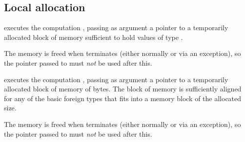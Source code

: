 \subsection{Local allocation}
\begin{haddockdesc}
\item[\begin{tabular}{@{}l}
alloca :: Storable a => (Ptr a -> IO b) -> IO b
\end{tabular}]
{\haddockbegindoc
{} executes the computation , passing as argument
 a pointer to a temporarily allocated block of memory sufficient to
 hold values of type .\par
The memory is freed when  terminates (either normally or via an
 exception), so the pointer passed to  must \emph{not} be used after this.\par}
\end{haddockdesc}
\begin{haddockdesc}
\item[\begin{tabular}{@{}l}
allocaBytes :: Int -> (Ptr a -> IO b) -> IO b
\end{tabular}]
{\haddockbegindoc
{} executes the computation , passing as argument
 a pointer to a temporarily allocated block of memory of  bytes.
 The block of memory is sufficiently aligned for any of the basic
 foreign types that fits into a memory block of the allocated size.\par
The memory is freed when  terminates (either normally or via an
 exception), so the pointer passed to  must \emph{not} be used after this.\par}
\end{haddockdesc}
